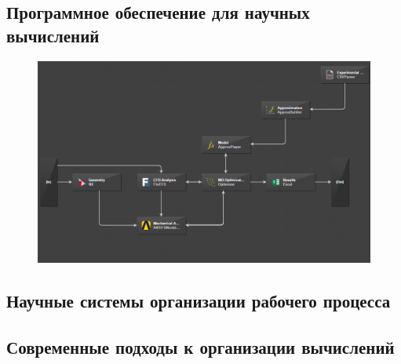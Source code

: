 ﻿%
\subsection{Программное обеспечение для научных вычислений}
\begin{frame}
  \begin{figure}
    \centering
    \includegraphics[width=\textwidth]{images/workflow1.png}
  \end{figure}

\end{frame}
\subsection{Научные системы организации рабочего процесса}
\begin{frame}



\end{frame}
\subsection{Современные подходы к организации вычислений}
\begin{frame}


\end{frame}
